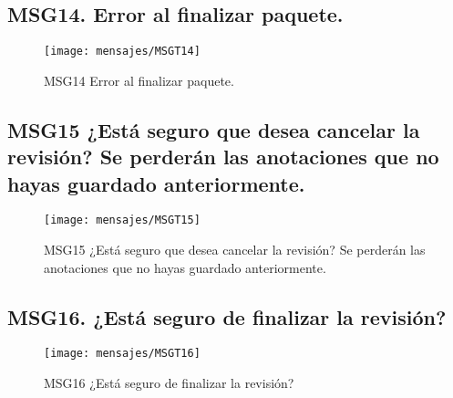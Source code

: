 \subsection{MSG14. Error al finalizar paquete.}
    \begin{figure}[htbp]
        \begin{center}
            \texttt{[image: mensajes/MSGT14]}
            \caption{MSG14 Error al finalizar paquete.}
            \label{fig:MSG14}
        \end{center}
    \end{figure}

\subsection{MSG15 ¿Está seguro que desea cancelar la revisión? Se perderán las anotaciones que no hayas guardado anteriormente.}
    \begin{figure}[htbp]
        \begin{center}
            \texttt{[image: mensajes/MSGT15]}
            \caption{MSG15 ¿Está seguro que desea cancelar la revisión? Se perderán las anotaciones que no hayas guardado anteriormente.}
            \label{fig:MSG15}
        \end{center}
    \end{figure}

\subsection{MSG16. ¿Está seguro de finalizar la revisión?}
    \begin{figure}[htbp]
        \begin{center}
            \texttt{[image: mensajes/MSGT16]}
            \caption{MSG16 ¿Está seguro de finalizar la revisión?}
            \label{fig:MSG16}
        \end{center}
    \end{figure}

